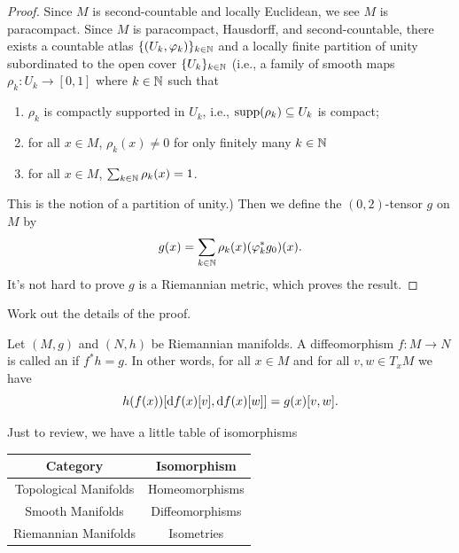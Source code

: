 \begin{proof}
Since $M$ is second-countable and locally Euclidean, we see $M$ is
paracompact. Since $M$ is paracompact, Hausdorff, and
second-countable, there exists a countable atlas
$\{(U_{k},\varphi_{k})\}_{k\in\mathbb{N}}$ and a locally finite partition of
unity subordinated to the open cover $\{U_{k}\}_{k\in\mathbb{N}}$ (i.e., a
family of smooth maps $\rho_{k}\colon U_{k}\to[0,1]$ where $k\in\mathbb{N}$
such that
\begin{enumerate}
\item $\rho_{k}$ is compactly supported in $U_{k}$, i.e.,
  $\operatorname{supp}(\rho_{k})\subseteq U_{k}$ is compact;
\item for all $x\in M$, $\rho_{k}(x)\neq0$ for only finitely many $k\in\mathbb{N}$
\item for all $x\in M$, $\sum_{k\in\mathbb{N}}\rho_{k}(x)=1$.
\end{enumerate}
This is the notion of a partition of unity.) Then we define the
$(0,2)$-tensor $g$ on $M$ by
\begin{equation}
g(x)=\sum_{k\in\mathbb{N}}\rho_{k}(x)(\varphi^{*}_{k}g_{0})(x).
\end{equation}
It's not hard to prove $g$ is a Riemannian metric, which proves the result.
\end{proof}

\begin{xca}
Work out the details of the proof.
\end{xca}

\begin{definition}[Isometry]
Let $(M,g)$ and $(N,h)$ be Riemannian manifolds. A diffeomorphism
$f\colon M\to N$ is called an  if $f^{*}h=g$. In
other words, for all $x\in M$ and for all $v,w\in T_{x}M$ we have
\begin{equation}
h(f(x))[\mathrm{d} f(x)[v],\mathrm{d} f(x)[w]]=g(x)[v,w].
\end{equation}
\end{definition}

\begin{node}
Just to review, we have a little table of isomorphisms
\begin{center}
\begin{tabular}{c|c}
Category & Isomorphism \\\hline
Topological Manifolds & Homeomorphisms\\
Smooth Manifolds & Diffeomorphisms\\
Riemannian Manifolds & Isometries
\end{tabular}
\end{center}
\end{node}
